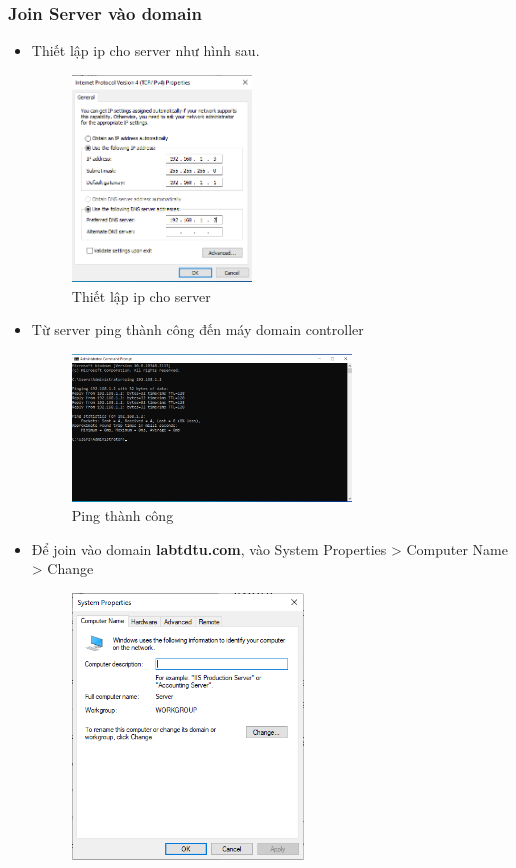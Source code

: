 \documentclass[13pt]{report}
\begin{document}
	\subsubsection{Join Server vào domain}
	\begin{itemize}
		\item Thiết lập ip cho server như hình sau.
		\begin{figure}[htp]
			\centering
			\includegraphics[width=0.45\textwidth]{image/Gui/FIT-WEB/1.png}
			\caption{Thiết lập ip cho server}
		\end{figure}
		\newpage
		\item Từ server ping thành công đến máy domain controller
		\begin{figure}[htp]
			\centering
			\includegraphics[width=0.7\textwidth]{image/Gui/FIT-WEB/2.png}
			\caption{Ping thành công}
		\end{figure}
		\item Để join vào domain \textbf{labtdtu.com}, vào System Properties > Computer Name > Change
		\begin{figure}[htp]
			\centering
			\includegraphics[width=0.58\textwidth]{image/Gui/FIT-WEB/3.png}

\end{figure}
\end{itemize}
\end{document}
